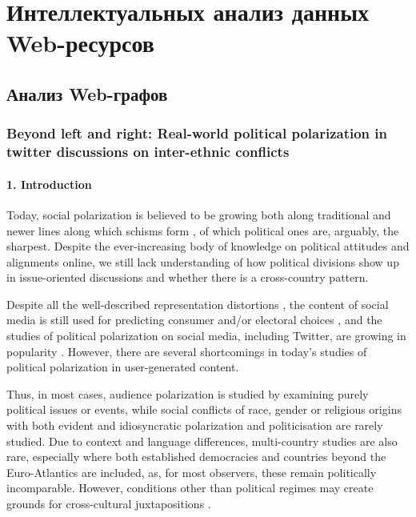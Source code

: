 \chapter{Интеллектуальных анализ данных Web-ресурсов}\label{ch:ch5}

\section{Анализ Web-графов}\label{sec:ch5/sect1}

\subsection{Beyond left and right: Real-world political polarization in twitter discussions on inter-ethnic conflicts}\label{subsec:ch5/sec1/sub1}

\subsubsection{1. Introduction}

Today, social polarization is believed to be growing both along traditional and newer lines along which schisms form \cite{DucaSaving}, of which political ones are, arguably, the sharpest. Despite the ever-increasing body of knowledge on political attitudes and alignments online, we still lack understanding of how political divisions show up in issue-oriented discussions and whether there is a cross-country pattern.

Despite all the well-described representation distortions \cite{Daniels}, the content of social media is still used for predicting consumer and/or electoral choices \cite{ColleoniRozzaArvidsson}, and the studies of political polarization on social media, including Twitter, are growing in popularity \cite{Barbera}. However, there are several shortcomings in today’s studies of political polarization in user-generated content.

Thus, in most cases, audience polarization is studied by examining purely political issues or events, while social conflicts of race, gender or religious origins with both evident and idiosyncratic polarization and politicisation \cite{McCrightDunlap} are rarely studied. Due to context and language differences, multi-country studies are also rare, especially where both established democracies and countries beyond the Euro-Atlantics are included, as, for most observers, these remain politically incomparable. However, conditions other than political regimes may create grounds for cross-cultural juxtapositions \cite{BodrunovaLitvinenkoBlekanov,BodrunovaBlekanovMaksimov}.

